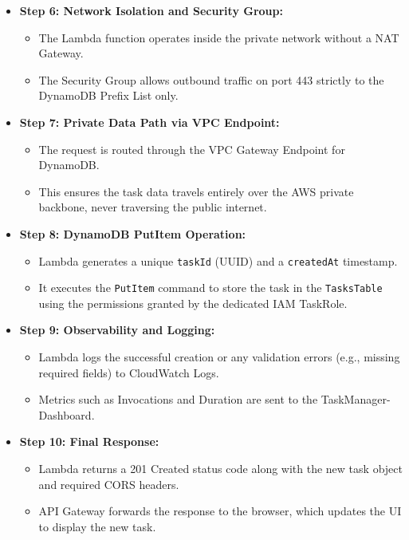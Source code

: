 \begin{itemize}
\begin{itemize}
  \end{itemize}
  \item \textbf{Step 6: Network Isolation and Security Group:}
  \begin{itemize}
    \item The Lambda function operates inside the private network without a NAT Gateway.
    \item The Security Group allows outbound traffic on port 443 strictly to the DynamoDB Prefix List only.
  \end{itemize}
  \item \textbf{Step 7: Private Data Path via VPC Endpoint:}
  \begin{itemize}
    \item The request is routed through the VPC Gateway Endpoint for DynamoDB.
    \item This ensures the task data travels entirely over the AWS private backbone, never traversing the public internet.
  \end{itemize}
  \item \textbf{Step 8: DynamoDB PutItem Operation:}
  \begin{itemize}
    \item Lambda generates a unique \texttt{taskId} (UUID) and a \texttt{createdAt} timestamp.
    \item It executes the \texttt{PutItem} command to store the task in the \texttt{TasksTable} using the permissions granted by the dedicated IAM TaskRole.
  \end{itemize}
  \item \textbf{Step 9: Observability and Logging:}
  \begin{itemize}
    \item Lambda logs the successful creation or any validation errors (e.g., missing required fields) to CloudWatch Logs.
    \item Metrics such as Invocations and Duration are sent to the TaskManager-Dashboard.
  \end{itemize}
  \item \textbf{Step 10: Final Response:}
  \begin{itemize}
    \item Lambda returns a 201 Created status code along with the new task object and required CORS headers.
    \item API Gateway forwards the response to the browser, which updates the UI to display the new task.
  \end{itemize}
\end{itemize}

